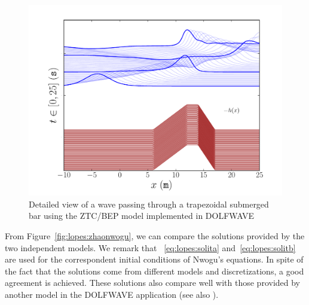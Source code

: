 \begin{figure}
  \begin{center}
    \includegraphics[width=\largefig]{chapters/lopes/pdf/submergedbar.pdf}
  \end{center}
  \caption{Detailed view of a wave passing through a trapezoidal
    submerged bar using the ZTC/BEP model implemented in DOLFWAVE}
  \label{fig:lopes:submergedbar}
\end{figure}

From Figure~\ref{fig:lopes:zhaonwogu}, we can compare the solutions
provided by the two independent models.  We remark that
~\eqref{eq:lopes:solita} and~\eqref{eq:lopes:solitb} are used for the
correspondent initial conditions of Nwogu's equations.  In spite of
the fact that the solutions come from different models and
discretizations, a good agreement is achieved.  These solutions also
compare well with those provided by another model in the DOLFWAVE
application (see also ).

